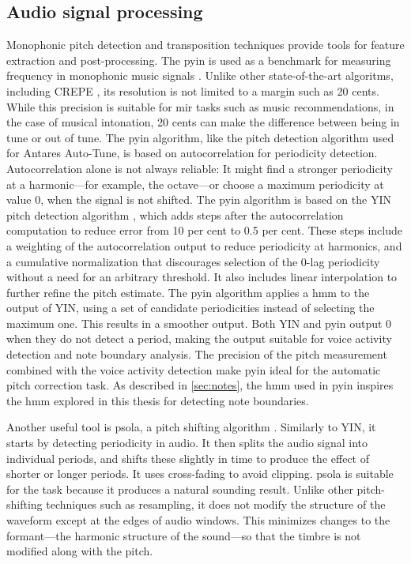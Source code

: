 \subsection{Audio signal processing}
Monophonic pitch detection and transposition techniques provide tools for feature extraction and post-processing. The \gls{pyin} \cite{mauch2014pyin} is used as a benchmark for measuring frequency in monophonic music signals \cite{devaney2020new}. Unlike other state-of-the-art algoritms, including CREPE \cite{kim2018crepe}, its resolution is not limited to a margin such as 20 cents. While this precision is suitable for \gls{mir} tasks such as music recommendations, in the case of musical intonation, 20 cents can make the difference between being in tune or out of tune. The \gls{pyin} algorithm, like the pitch detection algorithm used for Antares Auto-Tune, is based on autocorrelation for periodicity detection. Autocorrelation alone is not always reliable: It might find a stronger periodicity at a harmonic---for example, the octave---or choose a maximum periodicity at value 0, when the signal is not shifted. The \gls{pyin} algorithm is based on the YIN pitch detection algorithm \cite{de2002yin}, which adds steps after the autocorrelation computation to reduce error from 10 per cent to 0.5 per cent. These steps include a weighting of the autocorrelation output to reduce periodicity at harmonics, and a cumulative normalization that discourages selection of the 0-lag periodicity without a need for an arbitrary threshold. It also includes linear interpolation to further refine the pitch estimate. The \gls{pyin} algorithm applies a \gls{hmm} to the output of YIN, using a set of candidate periodicities instead of selecting the maximum one. This results in a smoother output. Both YIN and \gls{pyin} output 0 when they do not detect a period, making the output suitable for voice activity detection and note boundary analysis. The precision of the pitch measurement combined with the voice activity detection make \gls{pyin} ideal for the automatic pitch correction task. As described in \ref{sec:notes}, the \gls{hmm} used in \gls{pyin} inspires the \gls{hmm} explored in this thesis for detecting note boundaries. 

Another useful tool is \gls{psola}, a pitch shifting algorithm \cite{charpentier1986diphone}. Similarly to YIN, it starts by detecting periodicity in audio. It then splits the audio signal into individual periods, and shifts these slightly in time to produce the effect of shorter or longer periods. It uses cross-fading to avoid clipping. \gls{psola} is suitable for the task because it produces a natural sounding result. Unlike other pitch-shifting techniques such as resampling, it does not modify the structure of the waveform except at the edges of audio windows. This minimizes changes to the formant---the harmonic structure of the sound---so that the timbre is not modified along with the pitch. 

